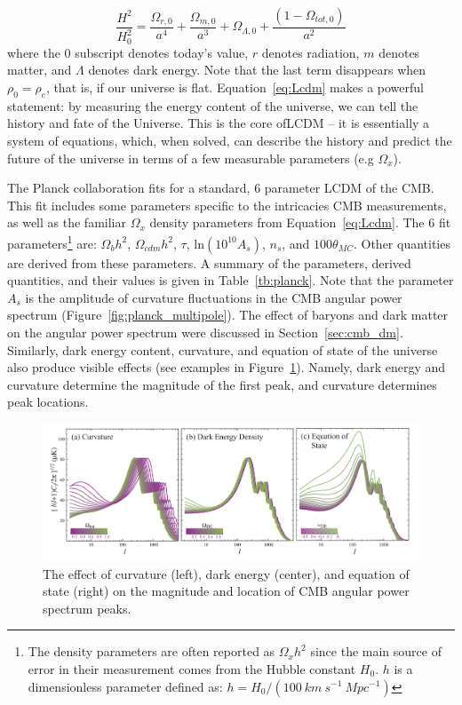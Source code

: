 \begin{equation}
\label{eq:Lcdm}
\frac{H^{2}}{H_{0}^{2}} = \frac{\Omega_{r, 0}}{a^{4}} + \frac{\Omega_{m, 0}}{a^{3}} + \Omega_{\Lambda, 0} + \frac{( 1 - \Omega_{tot,0})}{a^{2}} 
\end{equation}
where the $0$ subscript denotes today's value, $r$ denotes radiation, $m$ denotes matter, and $\Lambda$ denotes dark energy. Note that the last term disappears when $\rho_{0} = \rho_{c}$, that is, if our universe is flat. Equation~\ref{eq:Lcdm} makes a powerful statement: by measuring the energy content of the universe, we can tell the history and fate of the Universe. This is the core of\ac{LCDM} -- it is essentially a system of equations, which, when solved, can describe the history and predict the future of the universe in terms of a few measurable parameters (e.g $\Omega_{x}$). 

The Planck collaboration fits for a standard, 6 parameter \ac{LCDM} of the \ac{CMB}. This fit includes some parameters specific to the intricacies \ac{CMB} measurements, as well as the familiar $\Omega_{x}$ density parameters from Equation~\ref{eq:Lcdm}. The 6 fit parameters\footnote{ The density parameters are often reported as $\Omega_{x}h^{2}$ since the main source of error in their measurement comes from the Hubble constant $H_{0}$. $h$ is a dimensionless parameter defined as: $h = H_{0}/( 100~km~s^{-1}~Mpc^{-1})$} are:  $\Omega_{b}h^{2}$, $\Omega_{cdm}h^{2}$, $\tau$, ln$(10^{10}A_{s})$, $n_{s}$, and $100\theta_{MC}$. Other quantities are derived from these parameters. A summary of the parameters, derived quantities, and their values is given in Table~\ref{tb:planck}. Note that the parameter $A_{s}$ is the amplitude of curvature fluctuations in the \ac{CMB} angular power spectrum (Figure~\ref{fig:planck_multipole}). The effect of baryons and dark matter on the angular power spectrum were discussed in Section~\ref{sec:cmb_dm}. Similarly, dark energy content, curvature, and equation of state of the universe also produce visible effects (see examples in Figure~\ref{fig:curve_etc}). Namely, dark energy and curvature determine the magnitude of the first peak, and curvature determines peak locations.

\begin{figure}[htb]
\begin{center}
\includegraphics[width=\textwidth]{figures/theory/curve_etc.png}
\caption{The effect of curvature (left), dark energy (center), and equation of state (right) on the magnitude and location of \acs{CMB} angular power spectrum peaks.  \cite{Hu2008} }
\label{fig:curve_etc}
\end{center}
\end{figure}


